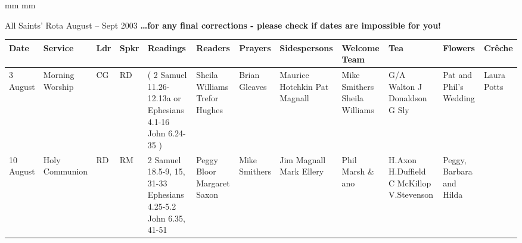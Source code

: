 \documentclass[10pt,a4paper]{article}
\newif\ifpdf
\begin{document}
\ifx\pdfoutput\undefined
\else
{} mm %
 mm
\fi
\begingroup
\ifpdf
\else
{}
\fi
\endgroup
\thispagestyle{empty}
\begin{center}
{\Large 
All Saints' Rota August -- Sept 2003}%
\vspace{1em}
{\bf \Large \ldots for any final corrections - please check if dates are
  impossible for you!} 
{ \small
\begin{tabular}{|p{1.6cm}|p{1.4cm}|p{0.6cm}|p{0.6cm}|p{3.2cm}|p{2cm}|p{1.5cm}|p{2.0cm}|p{2.0cm}|p{2.0cm}
|p{1.6cm}|p{1.4cm}|}\hline
Date & Service
& Ldr & Spkr & Readings & Readers & Prayers &
Sidespersons & Welcome Team & Tea & Flowers & Cr\^{e}che \\ %
\hline\hline
3 August   &  Morning Worship & CG  & RD &   
{\footnotesize (
2 Samuel 11.26-12.13a or
Ephesians 4.1-16 
John 6.24-35
) }
& 
Sheila Williams  Trefor Hughes & Brian Gleaves &
 Maurice Hotchkin Pat Magnall  & Mike Smithers Sheila Williams & 
G/A Walton  \linebreak J Donaldson  \linebreak G Sly
& Pat and Phil's Wedding  &  Laura Potts  \\ \hline %
 10 August  & Holy Communion & RD  & RM & 
2 Samuel 18.5-9, 15, 31-33 
Ephesians 4.25-5.2 
John 6.35, 41-51
 & Peggy Bloor \linebreak  Margaret Saxon & Mike Smithers &
Jim Magnall Mark Ellery &  Phil Marsh \& ano  & 
 H.Axon  \linebreak H.Duffield   C McKillop    V.Stevenson
& Peggy, Barbara and Hilda  &      \\ \hline

\end{tabular}}
\end{center}
\end{document}

